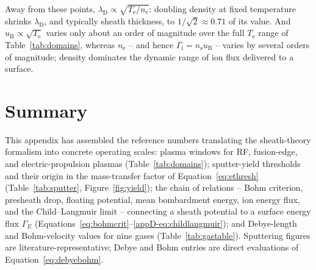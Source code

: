 Away from these points, $\lambda_{\mathrm{D}} \propto \sqrt{T_{\mathrm{e}}/n_{\mathrm{e}}}$: doubling density at fixed temperature shrinks $\lambda_{\mathrm{D}}$, and typically sheath thickness, to $1/\sqrt{2}\approx0.71$ of its value. And $u_{\mathrm{B}} \propto \sqrt{T_{\mathrm{e}}}$ varies only about an order of magnitude over the full $T_{\mathrm{e}}$ range of Table~\ref{tab:domains}, whereas $n_{\mathrm{e}}$ -- and hence $\Gamma_{\mathrm{i}}=n_{\mathrm{s}}u_{\mathrm{B}}$ -- varies by several orders of magnitude; density dominates the dynamic range of ion flux delivered to a surface.

\section{Summary}

This appendix has assembled the reference numbers translating the sheath-theory formalism into concrete operating scales: plasma windows for RF, fusion-edge, and electric-propulsion plasmas (Table~\ref{tab:domains}); sputter-yield thresholds and their origin in the mass-transfer factor of Equation~\eqref{eq:ethresh} (Table~\ref{tab:sputter}, Figure~\ref{fig:yield}); the chain of relations -- Bohm criterion, presheath drop, floating potential, mean bombardment energy, ion energy flux, and the Child--Langmuir limit -- connecting a sheath potential to a surface energy flux $\Gamma_E$ (Equations~\eqref{eq:bohmcrit}--\eqref{appD-eq:childlangmuir}); and Debye-length and Bohm-velocity values for nine gases (Table~\ref{tab:gastable}). Sputtering figures are literature-representative; Debye and Bohm entries are direct evaluations of Equation~\eqref{eq:debyebohm}.
